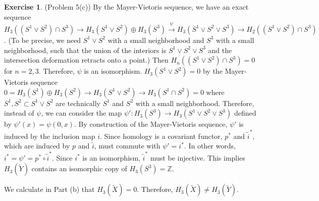 \documentclass[12pt, psamsfonts]{amsart}
\theoremstyle{definition}
\newtheorem*{exer}{Exercise}
\theoremstyle{remark}
\numberwithin{equation}{section}
\begin{document}
\begin{exer}{(Problem 5(c))}
  By the Mayer-Vietoris sequence, we have an exact sequence $H_3((S^1 \vee S^2) \cap S^3) \rightarrow H_3(S^1 \vee S^2) \oplus H_3(S^3) \xrightarrow{\psi} H_3(S^1 \vee S^2 \vee S^3) \rightarrow H_2((S^1 \vee S^2) \cap S^3)$.
  (To be precise, we need $S^1 \vee S^2$ with a small neighborhood and $S^3$ with a small neighborhood, such that the union of the interiors is $S^1 \vee S^2 \vee S^3$ and the intersection deformation retracts onto a point.)
  Then $H_n((S^1 \vee S^2) \cap S^3) = 0$ for $n = 2, 3$.
  Therefore, $\psi$ is an isomorphism.
  $H_3(S^1 \vee S^2) = 0$ by the Mayer-Vietoris sequence $0 = H_3(S^1) \oplus H_3(S^2) \rightarrow H_3(S^1 \vee S^2) \rightarrow H_3(S^1 \cap S^2) = 0$ where $S^1, S^2 \subset S^1 \vee S^2$ are technically $S^1$ and $S^2$ with a small neighborhood.
  Therefore, instead of $\psi$, we can consider the map $\psi': H_3(S^3) \rightarrow H_3(S^1 \vee S^2 \vee S^3)$ defined by $\psi'(x) = \psi(0, x)$.
  By construction of the Mayer-Vietoris sequence, $\psi'$ is induced by the inclusion map $i$.
  Since homology is a covariant functor, $p^*$ and $\tilde{i}^*$, which are induced by $p$ and $\tilde{i}$, must commute with $\psi' = i^*$.
  In other words, $i^{*} = \psi' = p^{*} \circ \tilde{i}^{*}$.
  Since $i^*$ is an isomorphism, $\tilde{i}^*$ must be injective.
  This implies $H_3(\tilde{Y})$ contains an isomorphic copy of $H_3(S^3) = \mathbb{Z}$.

  We calculate in Part (b) that $H_3(\tilde{X}) = 0$.
  Therefore, $H_3(\tilde{X}) \ne H_3(\tilde{Y})$.
\end{exer}
\end{document}
